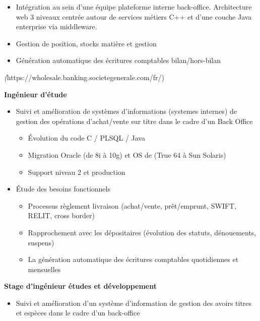 \documentclass[11pt,a4paper]{moderncv}
\begin{document}
{\bigskip
			\begin{itemize}
				\item Intégration au sein d'une équipe plateforme interne back-office. Architecture web 3 niveaux centrée autour de services métiers C++ et d'une couche Java enterprise via middleware.
				\item Gestion de position, stocks matière et gestion
				\item Génération automatique des écritures comptables bilan/hors-bilan
			\end{itemize}
}

\newpage

{
	\textit(https://wholesale.banking.societegenerale.com/fr/)

	\bigskip
	\textbf{Ingénieur d'étude}
\bigskip
\begin{itemize}
\item Suivi et amélioration de systèmes d’informations (systemes internes) de gestion des opérations d’achat/vente sur titre dans le cadre d’un Back Office
	\begin{itemize}
		\item Évolution du code C / PLSQL / Java
		\item Migration Oracle (de 8i à 10g) et OS de (True 64 à Sun Solaris)
		\item Support niveau 2 et production
\end{itemize}
\bigskip
\item Étude des besoins fonctionnels
	\begin{itemize}
		\item Processus règlement livraison (achat/vente, prêt/emprunt, SWIFT, RELIT, cross border)
		\item Rapprochement avec les dépositaires (évolution des statuts, dénouements, suspens)
		\item La génération automatique des écritures comptables quotidiennes et mensuelles
	\end{itemize}
\end{itemize}
}
\bigskip
{}
{
\bigskip
\textbf{Stage d’ingénieur études et développement}
\bigskip
\begin{itemize}
	\item Suivi et amélioration d’un système d’information de gestion des avoirs titres et espèces dans le cadre d’un back-office
\end{itemize}
}
\end{document}
